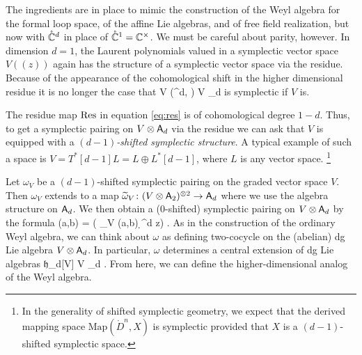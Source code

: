 \documentclass[11pt]{amsart}
\def\til{\Tilde}
\def\lie#1{\ensuremath{\mathfrak{#1}}}
\begin{document}

The ingredients are in place to mimic the construction of the Weyl algebra for the formal loop space, of the affine Lie algebras, and of free field realization, but now with $\mathring{\mathbb C}^d$ in place of $\mathring{\mathbb C}^1 = \mathbb C^\times$.
We must be careful about parity, however. 
In dimension $d = 1$, the Laurent polynomials valued in a symplectic vector space $V((z))$ again has the structure of a symplectic vector space via the residue. 
Because of the appearance of the cohomological shift in the higher dimensional residue it is no longer the case that 
\beqn
V \otimes \RR\Gamma(^d, \cO) \simeq V \otimes \sfA_d
\eeqn
is symplectic if $V$ is.

The residue map ${\rm Res}$ in equation \eqref{eq:res} is of cohomological degree $1-d$. 
Thus, to get a symplectic pairing on $V \otimes \mathsf A_d$ via the residue we can ask that $V$ is equipped with a {\em $(d-1)$-shifted symplectic structure}. 
A typical example of such a space is $V = T^*[d-1] L = L \oplus L^*[d-1]$, where $L$ is any vector space.
\footnote{In the generality of shifted symplectic geometry, we expect that the derived mapping space $\text{Map}(\mathring{D}^n, X)$ is symplectic provided that $X$ is a $(d-1)$-shifted symplectic space.}

Let $\omega_V$ be a $(d-1)$-shifted symplectic pairing on the graded vector space $V$. 
Then $\omega_V$ extends to a map $\til \omega_V \colon (V \otimes \sfA_2)^{\otimes 2} \to \sfA_d$ where we use the algebra structure on $\mathsf A_d$. 
We then obtain a ($0$-shifted) symplectic pairing on $V \otimes \mathsf A_d$ by the formula
\beqn
\label{eqn:omega}
\omega(a,b) = \Res ( \til \omega_V (a,b) \wedge \d^d z) .
\eeqn
As in the construction of the ordinary Weyl algebra, we can think about $\omega$ as defining two-cocycle on the (abelian) dg Lie algebra $V \otimes \mathsf A_d$.
In particular, $\omega$ determines a central extension of dg Lie algebras
\beqn
\CC \to \lie{h}_d[V] \to V \otimes \sfA_d .
\eeqn
From here, we can define the higher-dimensional analog of the Weyl algebra. 
\end{document}
